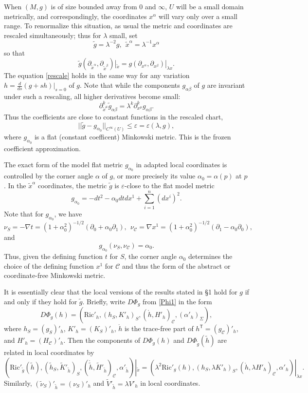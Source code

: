 \documentclass[10pt]{amsart}
\renewcommand{\a}{\alpha}
\renewcommand{\b}{\beta}
\newcommand{\e}{\varepsilon}
\newcommand{\Si}{\Sigma}
\renewcommand{\l}{\lambda}
\newcommand{\cC}{{\mathcal C}}
\newcommand{\Ric}{\mathrm{Ric}}
\newcommand{\tT}{\mathsf{T}}
\newcommand{\be}{\begin{equation}}
\newcommand{\ee}{\end{equation}}
\newcommand{\bes}{\begin{equation*}}
\newcommand{\ees}{\end{equation*}}
\newcommand{\p}{\partial}
\newcommand{\<}{\langle}
\renewcommand{\>}{\rangle}
\newcommand{\w}{\widetilde}
\theoremstyle{plain}
\theoremstyle{remark}
\theoremstyle{definition}
\numberwithin{equation}{section}
\begin{document}
  When $(M, g)$ is of size bounded away from $0$ and $\infty$, $U$ will be a small domain metrically, and correspondingly, the coordinates 
$x^{\a}$ will vary only over a small range. To renormalize this situation, as usual the metric and coordinates are rescaled simultaneously; thus 
for $\l$ small, set 
$$\w g = \l^{-2}g, \ \ \w x^\a=\l^{-1}x^\a$$
so that 
\be\label{rescale}
\w g(\p_{\w x^\a},\p_{\w x^\b})|_{\w x}=g(\p_{ x^\a},\p_{ x^\b})|_{\l x}. 
\ee
The equation \eqref{rescale} holds in the same way for any variation $h = \frac{d}{ds}(g + sh)|_{s=0}$ of $g$. Note that while the components 
$g_{\a\b}$ of $g$ are invariant under such a rescaling, all higher derivatives become small: 
$$\p_{\w x^{\mu}}^k \w g_{\a\b} = \l^k \p_{x^{\mu}}^k g_{\a\b}.$$ 
Thus the coefficients are close to constant functions in the rescaled chart, 
\be \label{eps}
||\w g - g_{\a_0}||_{C^{\infty}(U)} \leq \e = \e(\l, g),
\ee
where $g_{\a_0}$ is a flat (constant coefficent) Minkowski metric. This is the frozen coefficient approximation. 

   The exact form of the model flat metric $g_{\a_0}$ in adapted local coordinates is controlled by the corner angle $\a$ of $g$, 
or more precisely its value $\a_0 = \a(p)$ at $p$. In the $\w x^{\a}$ coordinates, the metric $\w g$ is $\e$-close to the flat model metric
\bes
g_{\a_0} =-dt^2-\a_0 dtdx^1+\sum_{i=1}^n(dx^i)^2.
\ees
Note that for $g_{\a_0}$, we have 
\be \label{normals}
\nu_S = - \nabla t = (1+\a_0^2)^{-1/2}(\p_0+\a_0 \p_1),  \ \ \nu_\cC=\nabla x^1 = (1+\a_0^2)^{-1/2}(\p_1-\a_0 \p_0),
\ee 
and 
$$g_{\a_0}(\nu_S,\nu_\cC)=\a_0.$$
Thus, given the defining function $t$ for $S$, the corner angle $\a_0$ determines the choice of the defining function $x^1$ for $\cC$ and thus 
the form of the abstract or coordinate-free Minkowski metric. 

  It is essentially clear that the local versions of the results stated in \S 1 hold for $g$ if and only if they hold for $\w g$. Briefly, 
write $D\Phi_g$ from \eqref{Phi1} in the form 
$$D\Phi_g(h) = (\Ric'_h, (h_S, K'_h)_S, (\ring{h}, H'_h)_{\cC}, (\a'_h)_{\Si}),$$
where $h_S = (g_S)'_h$, $K'_h = (K_S)'_h$, $\ring{h}$ is the trace-free part of $h^{\tT} = (g_{\cC})'_h$, and $H'_h = (H_{\cC})'_h$. 
Then the components of $D\Phi_g(h)$ and $D\Phi_{\w g}(\w h)$ are related in local coordinates by
$$(\Ric'_{\w g}(\w h), (\w h_S, \w K'_{\w h})_S, (\ring{\w h}, \w H'_{\w h})_{\cC}, \a'_{\w h})|_{\w x} = 
(\l^2 \Ric'_g(h), (h_S, \l K'_{h})_S, (\ring{ h}, \l H'_h)_{\cC}, \a'_h)|_{\l x}.$$ 
Similarly, $(\w \nu_S)'_{\w h} = (\nu_S)'_h$ and $\w V'_{\w h} = \l V'_h$ in local coordinates. 
\end{document}
